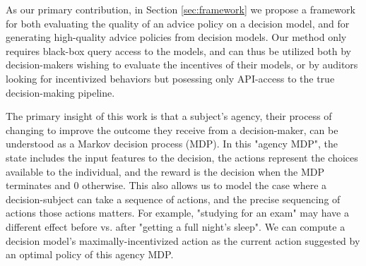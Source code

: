 
As our primary contribution, in Section \ref{sec:framework} we propose a framework for both evaluating the quality of an advice policy on a decision model, and for generating high-quality advice policies from decision models. Our method only requires black-box query access to the models, and can thus be utilized both by decision-makers wishing to evaluate the incentives of their models, or by auditors looking for incentivized behaviors but posessing only API-access to the true decision-making pipeline.

The primary insight of this work is that a subject's agency, their process of changing to improve the outcome they receive from a decision-maker, can be understood as a Markov decision process (MDP). In this "agency MDP", the state includes the input features to the decision, the actions represent the choices available to the individual, and the reward is the decision when the MDP terminates and 0 otherwise. This also allows us to model the case where a decision-subject can take a sequence of actions, and the precise sequencing of actions those actions matters. For example, "studying for an exam" may have a different effect before vs. after "getting a full night's sleep". We can compute a decision model's maximally-incentivized action as the current action suggested by an optimal policy of this agency MDP.

